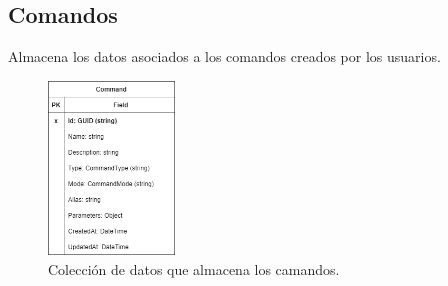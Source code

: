 \subsection{Comandos}

Almacena los datos asociados a los comandos creados por los usuarios.

\begin{figure}[H]
	\centering
	\includegraphics[width=0.3\textwidth]{img/database_architecture_command.png}
	\caption{Colección de datos que almacena los camandos.}
\end{figure}

